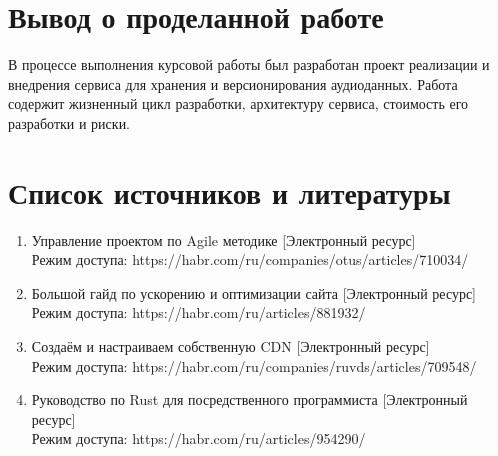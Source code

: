 \documentclass[a4paper,14pt]{extarticle}
\begin{document}
\section{Вывод о проделанной работе}
В процессе выполнения курсовой работы был разработан проект реализации и внедрения 
сервиса для хранения и версионирования аудиоданных. Работа содержит жизненный цикл разработки, 
архитектуру сервиса, стоимость его разработки и риски. 

\newpage

\section{Список источников и литературы}
\begin{enumerate}
    \item Управление проектом по Agile методике [Электронный ресурс] \\Режим доступа: https://habr.com/ru/companies/otus/articles/710034/
    \item Большой гайд по ускорению и оптимизации сайта [Электронный ресурс] \\Режим доступа: https://habr.com/ru/articles/881932/
    \item Создаём и настраиваем собственную CDN [Электронный ресурс] \\Режим доступа: https://habr.com/ru/companies/ruvds/articles/709548/
    \item Руководство по Rust для посредственного программиста [Электронный ресурс] \\Режим доступа: https://habr.com/ru/articles/954290/
\end{enumerate}

\newpage
\end{document}
